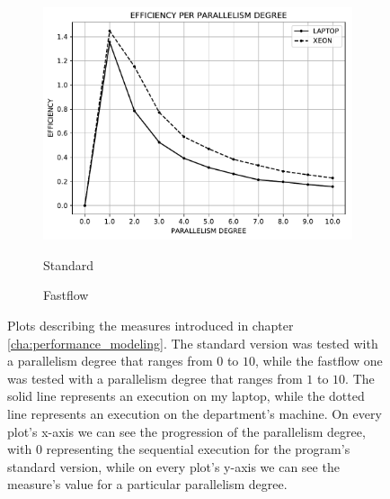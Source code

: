 \begin{figure}
\begin{subfigure}{0.33\textwidth}
{                \includegraphics{imgs/efficiency_standard.pdf}
            }
            \caption{Standard}
            \label{fig:efficiency_standard}
        \end{subfigure}
        \begin{subfigure}{0.33\textwidth}
            \caption{Fastflow}
            \label{fig:efficiency_fastflow}
        \end{subfigure}
        \caption{Plots describing the measures introduced in chapter \ref{cha:performance_modeling}. The standard
        version was tested with a parallelism degree that ranges from $0$ to $10$, while the fastflow one was
        tested with a parallelism degree that ranges from $1$ to $10$. The solid line represents an execution
        on my laptop, while the dotted line represents an execution on the department's machine. On every
        plot's x-axis we can see the progression of the parallelism degree, with $0$ representing
        the sequential execution for the program's standard version, while on every plot's
        y-axis we can see the measure's value for a particular parallelism degree.}
        \label{fig:performances}
    \end{figure}
    \newpage
    \setcounter{page}{2}
